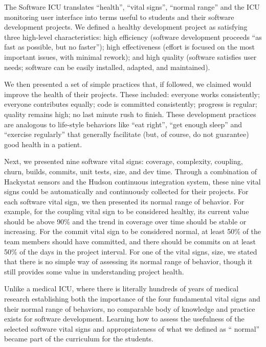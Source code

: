 The Software ICU translates ``health'', ``vital signs'', ``normal range''
and the ICU monitoring user interface into terms useful to students and
their software development projects.  We defined a healthy development
project as satisfying three high-level characteristics: high efficiency
(software development proceeds ``as fast as possible, but no faster'');
high effectiveness (effort is focused on the most important issues, with
minimal rework); and high quality (software satisfies user needs; software
can be easily installed, adapted, and maintained).

We then presented a set of simple practices that, if followed, we claimed
would improve the health of their projects.  These included: everyone works
consistently; everyone contributes equally; code is committed consistently;
progress is regular; quality remains high; no last minute rush to finish.
These development practices are analogous to life-style behaviors like
``eat right'', ``get enough sleep'' and ``exercise regularly'' that
generally facilitate (but, of course, do not guarantee) good health in a
patient.

Next, we presented nine software vital signs: coverage, complexity,
coupling, churn, builds, commits, unit tests, size, and dev time. Through a
combination of Hackystat sensors and the Hudson continuous integration
system, these nine vital signs could be automatically and continuously
collected for their projects.  For each software vital sign, we then
presented its normal range of behavior.  For example, for the coupling
vital sign to be considered healthy, its current value should be above 90\%
and the trend in coverage over time should be stable or increasing.  For
the commit vital sign to be considered normal, at least 50\% of the team
members should have committed, and there should be commits on at least 50\%
of the days in the project interval.  For one of the vital signs, size, we
stated that there is no simple way of assessing its normal range of
behavior, though it still provides some value in understanding project
health.

Unlike a medical ICU, where there is literally hundreds of years of medical
research establishing both the importance of the four fundamental vital
signs and their normal range of behaviors, no comparable body of knowledge
and practice exists for software development.  Learning how to assess the
usefulness of the selected software vital signs and appropriateness of what
we defined as `` normal'' became part of the curriculum for the students.


